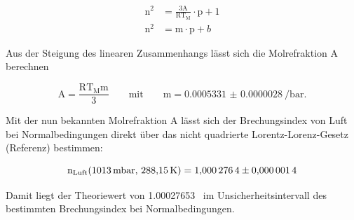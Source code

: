         \FloatBarrier

        \begin{align}
            \text{n}^2 &= \frac{3\text{A}}{\text{RT}_{\text{M}}} \cdot \text{p} + 1 \\
            \text{n}^2 &= \text{m} \cdot \text{p} + b
        \end{align}

        Aus der Steigung des linearen Zusammenhangs lässt sich die Molrefraktion A berechnen

        \begin{equation}
            \text{A} = \frac{\text{RT}_{\text{M}}\text{m}}{3} \qquad \text{mit} \qquad \text{m}=\SI{0.0005331(28)}{\per\bar}.
        \end{equation}

        Mit der nun bekannten Molrefraktion A lässt sich der Brechungsindex von Luft bei Normalbedingungen direkt über das nicht quadrierte Lorentz-Lorenz-Gesetz (Referenz) bestimmen:

        \begin{equation}
            \text{n}_{\text{Luft}}(\SI{1013}{\milli\bar}, \, \SI{288.15}{\kelvin}) = \num{1.0002764 +- 0.0000014}
        \end{equation}

        Damit liegt der Theoriewert von \num{1.00027653}~\cite{ciddor_refractive_1996} im Unsicherheitsintervall des bestimmten Brechungsindex bei Normalbedingungen.
        
